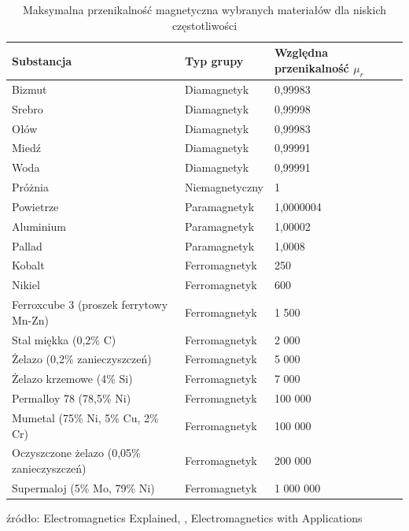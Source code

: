 \begin{table}[H]
    \centering
    \caption{Maksymalna przenikalność magnetyczna wybranych materiałów dla niskich częstotliwości}
    \begin{tabular}{l l l}
        \toprule
        \textbf{Substancja} & \textbf{Typ grupy} & \textbf{Względna przenikalność } $\mu_r$ \\
        \midrule
        Bizmut & Diamagnetyk & 0,99983 \\
        Srebro & Diamagnetyk & 0,99998 \\
        Ołów & Diamagnetyk & 0,99983 \\
        Miedź & Diamagnetyk & 0,99991 \\
        Woda & Diamagnetyk & 0,99991 \\
        \addlinespace
        Próżnia & Niemagnetyczny & 1 \\
        \addlinespace
        Powietrze & Paramagnetyk & 1,0000004 \\
        Aluminium & Paramagnetyk & 1,00002 \\
        Pallad & Paramagnetyk & 1,0008 \\
        \addlinespace
        Kobalt & Ferromagnetyk & 250 \\
        Nikiel & Ferromagnetyk & 600 \\
        Ferroxcube 3 (proszek ferrytowy Mn-Zn) & Ferromagnetyk & 1 500 \\
        Stal miękka (0,2\% C) & Ferromagnetyk & 2 000 \\
        Żelazo (0,2\% zanieczyszczeń) & Ferromagnetyk & 5 000 \\
        \addlinespace
        Żelazo krzemowe (4\% Si) & Ferromagnetyk & 7 000 \\
        Permalloy 78 (78,5\% Ni) & Ferromagnetyk & 100 000 \\
        Mumetal (75\% Ni, 5\% Cu, 2\% Cr) & Ferromagnetyk & 100 000 \\
        Oczyszczone żelazo (0,05\% zanieczyszczeń) & Ferromagnetyk & 200 000 \\
        Supermaloj (5\% Mo, 79\% Ni) & Ferromagnetyk & 1 000 000 \\
        \bottomrule
    \end{tabular}

    \vspace{0.2cm}
    \hfill\small źródło: Electromagnetics Explained, \cite{schmitt2002electromagnetics}, Electromagnetics with Applications \cite[p.~201]{kraus1999electromagnetics} 
\end{table}

